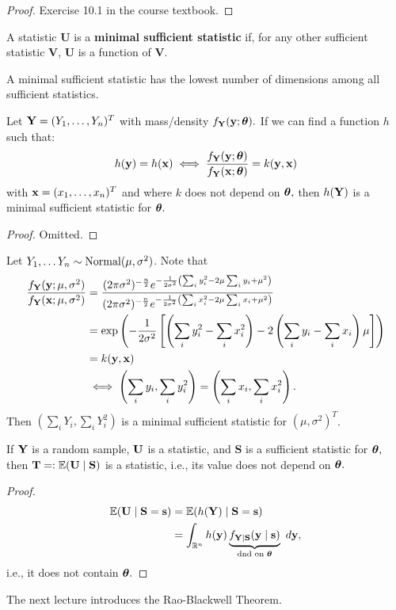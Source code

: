 \begin{proof}
Exercise 10.1 in the course textbook.
\end{proof}

\begin{definition}
A statistic $\mathbf U$ is a \textbf{minimal sufficient statistic} if, for any other sufficient statistic $\mathbf V$, $\mathbf U$ is a function of $\mathbf V.$
\end{definition}
A minimal sufficient statistic has the lowest number of dimensions among all sufficient statistics.

\begin{prop}
Let $\mathbf Y=(Y_1,\ldots, Y_n)^T$ with mass/density $f_\mathbf Y(\mathbf y;{\boldsymbol{\theta}}).$ If we can find a function $h$ such that:
$$
h(\mathbf y)=h(\mathbf x) \;\Longleftrightarrow\; \frac{f_\mathbf Y(\mathbf y;{\boldsymbol{\theta}})}{f_\mathbf Y(\mathbf x;{\boldsymbol{\theta}})} = k(\mathbf y,\mathbf x)
$$
with $\mathbf x=(x_1,\ldots,x_n)^T$ and where $k$ does not depend on ${\boldsymbol{\theta}},$ then $h(\mathbf Y)$ is a minimal sufficient statistic for ${\boldsymbol{\theta}}.$
\end{prop}

\begin{proof}
Omitted.
\end{proof}

\begin{eg}
Let $Y_1,\ldots Y_n\sim \operatorname*{Normal}(\mu,\sigma^2)$. Note that
\begin{align*}
    \frac{f_\mathbf Y(\mathbf y;\mu,\sigma^2)}{f_\mathbf Y(\mathbf x;\mu,\sigma^2)} &= \frac{(2\pi\sigma^2)^{-\frac{n}{2}}e^{-\frac{1}{2\sigma^2}\left(\sum_i y_i^2-2\mu\sum_i y_i +\mu^2\right)}}{(2\pi\sigma^2)^{-\frac{n}{2}}e^{-\frac{1}{2\sigma^2}\left(\sum_i x_i^2-2\mu\sum_ix_i +\mu^2\right)}}\\
    &=\exp\left(-\frac{1}{2\sigma^2}\left[\left(\sum_i y_i^2-\sum_ix_i^2\right)-2\left(\sum_i y_i - \sum_i x_i\right)\mu\right]\right) \\
    &= k(\mathbf y,\mathbf x) \\
    &\;\Longleftrightarrow\; \left(\sum_iy_i,\sum_i y_i^2\right)=\left(\sum_i x_i,\sum_ix_i^2\right).
\end{align*}
Then $\left(\sum_iY_i,\sum_iY_i^2\right)$ is a minimal sufficient statistic for $(\mu,\sigma^2)^T$. 
\end{eg}

\begin{prop}
If $\mathbf Y$ is a random sample, $\mathbf U$ is a statistic, and $\mathbf S$ is a sufficient statistic for ${\boldsymbol{\theta}},$ then $\mathbf T=:\mathbb E(\mathbf U \mid \mathbf S)$ is a statistic, i.e., its value does not depend on ${\boldsymbol{\theta}}.$
\end{prop}
\begin{proof}
\begin{align*}
    \mathbb E(\mathbf U\mid \mathbf S=\mathbf s)&= \mathbb E(h(\mathbf Y) \mid \mathbf S = \mathbf s) \\
    &= \int_{\mathbb R^n}h(\mathbf y)\underbrace{f_{\mathbf Y\mid \mathbf S}(\mathbf y\mid \mathbf s)}_{\text{dnd on ${\boldsymbol{\theta}}$}} \ d\mathbf y,
\end{align*}
i.e., it does not contain ${\boldsymbol{\theta}}.$
\end{proof}

The next lecture introduces the Rao-Blackwell Theorem.
